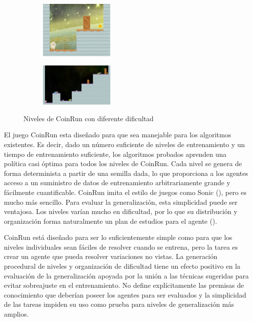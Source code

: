 \begin{figure}[ht!]
    \begin{subfigure}
      \centering
      \includegraphics[width=0.4\textwidth]{Graphics/coinrun_1.jpeg}
      \label{fig:coinrun1}
    \end{subfigure}%
    \begin{subfigure}
      \centering
      \includegraphics[width=0.4\textwidth]{Graphics/coinrun_2.jpeg}
      \label{fig:coinrun2}
    \end{subfigure}%
    \caption{Niveles de CoinRun con diferente dificultad}
    \label{fig:coinrun}
\end{figure}

El juego CoinRun esta diseñado para que sea manejable para los algoritmos existentes. Es decir, dado un número suficiente de niveles de entrenamiento y un tiempo de entrenamiento suficiente, los algoritmos probados aprenden una política casi óptima para todos los niveles de CoinRun. Cada nivel se genera de forma determinista a partir de una semilla dada, lo que proporciona a los agentes acceso a un suministro de datos de entrenamiento arbitrariamente grande y fácilmente cuantificable. CoinRun imita el estilo de juegos como Sonic (\cite{nichol2018gotta}), pero es mucho más sencillo. Para evaluar la generalización, esta simplicidad puede ser ventajosa. Los niveles varían mucho en dificultad, por lo que su distribución y organización forma naturalmente un plan de estudios para el agente (\cite{cobbe2019quantifying}).

CoinRun está diseñado para ser lo suficientemente simple como para que los niveles individuales sean fáciles de resolver cuando se entrena, pero la tarea es crear un agente que pueda resolver variaciones no vistas. La generación procedural de niveles y organización de dificultad tiene un efecto positivo en la evaluación de la generalización apoyada por la unión a las técnicas sugeridas para evitar sobreajuste en el entrenamiento. No define explícitamente las premisas de conocimiento que deberían poseer los agentes para ser evaluados y la simplicidad de las tareas impiden su uso como prueba para niveles de generalización más amplios.

